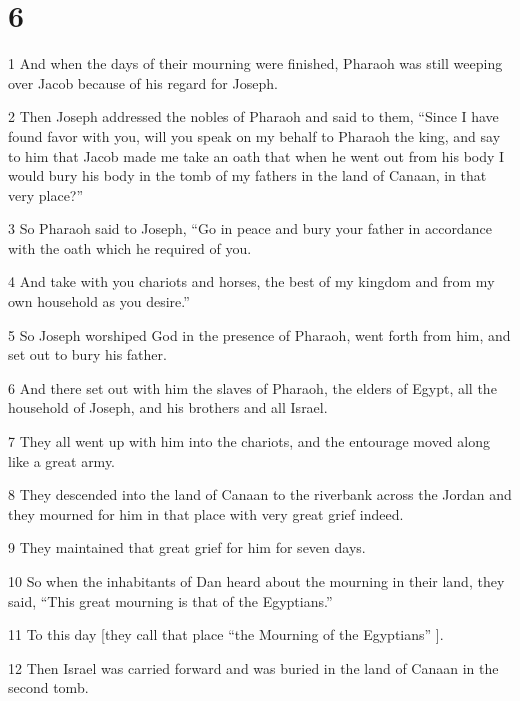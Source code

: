 \chapter{6}

\par 1 And when the days of their mourning were finished, Pharaoh was still weeping over Jacob because of his regard for Joseph. 

\par 2 Then Joseph addressed the nobles of Pharaoh and said to them, “Since I have found favor with you, will you speak on my behalf to Pharaoh the king, and say to him that Jacob made me take an oath that when he went out from his body I would bury his body in the tomb of my fathers in the land of Canaan, in that very place?” 

\par 3 So Pharaoh said to Joseph, “Go in peace and bury your father in accordance with the oath which he required of you. 

\par 4 And take with you chariots and horses, the best of my kingdom and from my own household as you desire.”

\par 5 So Joseph worshiped God in the presence of Pharaoh, went forth from him, and set out to bury his father. 

\par 6 And there set out with him the slaves of Pharaoh, the elders of Egypt, all the household of Joseph, and his brothers and all Israel. 

\par 7 They all went up with him into the chariots, and the entourage moved along like a great army. 

\par 8 They descended into the land of Canaan to the riverbank across the Jordan and they mourned for him in that place with very great grief indeed. 

\par 9 They maintained that great grief for him for seven days. 

\par 10 So when the inhabitants of Dan heard about the mourning in their land, they said, “This great mourning is that of the Egyptians.” 

\par 11 To this day [they call that place “the Mourning of the Egyptians” ].

\par 12 Then Israel was carried forward and was buried in the land of Canaan in the second tomb. 

